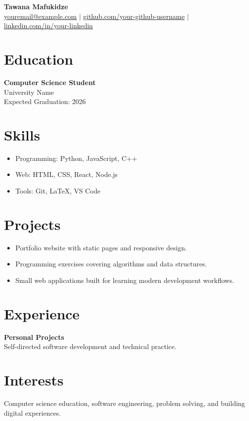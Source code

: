 \documentclass[11pt]{article}
\begin{document}
\begin{center}
  {\LARGE \textbf{Tawana Mafukidze}} \\
  \vspace{0.25em}
  \href{mailto:youremail@example.com}{youremail@example.com} $\vert$ 
  \href{https://github.com/your-github-username}{github.com/your-github-username} $\vert$ 
  \href{https://linkedin.com/in/your-linkedin}{linkedin.com/in/your-linkedin}
\end{center}

\section*{Education}

\textbf{Computer Science Student} \\
University Name \\
Expected Graduation: 2026

\section*{Skills}

\begin{itemize}[nosep]
  \item Programming: Python, JavaScript, C++
  \item Web: HTML, CSS, React, Node.js
  \item Tools: Git, LaTeX, VS Code
\end{itemize}

\section*{Projects}

\begin{itemize}[nosep]
  \item Portfolio website with static pages and responsive design.
  \item Programming exercises covering algorithms and data structures.
  \item Small web applications built for learning modern development workflows.
\end{itemize}

\section*{Experience}

\textbf{Personal Projects} \\
Self-directed software development and technical practice.

\section*{Interests}

Computer science education, software engineering, problem solving, and building digital experiences.
\end{document}
